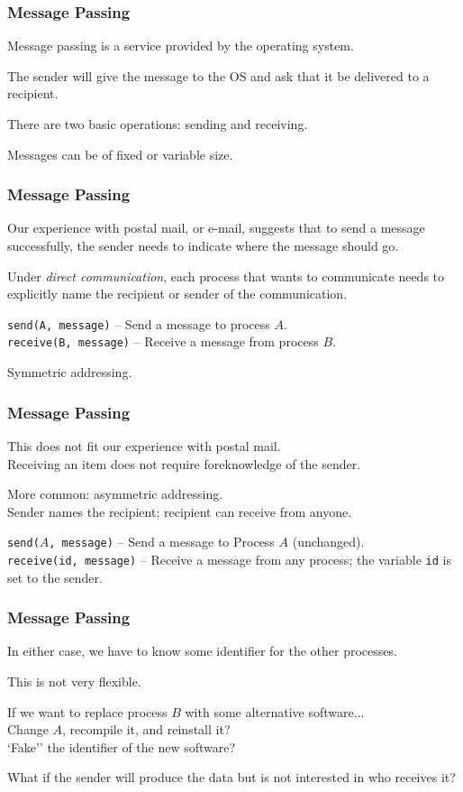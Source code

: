 \begin{frame}
\frametitle{Message Passing}

Message passing is a service provided by the operating system.

The sender will give the message to the OS and ask that it be delivered to a recipient.

  There are two basic operations: sending and receiving. 
  
  Messages can be of fixed or variable size.


\end{frame}

\begin{frame}
\frametitle{Message Passing}

Our experience with postal mail, or e-mail, suggests that to send a message successfully, the sender needs to indicate where the message should go. 

Under \textit{direct communication}, each process that wants to communicate needs to explicitly name the recipient or sender of the communication.


\texttt{send(A, message)} -- Send a message to process $A$.\\
\texttt{receive(B, message)} -- Receive a message from process $B$.

Symmetric addressing.

\end{frame}

\begin{frame}
\frametitle{Message Passing}

This does not fit our experience with postal mail.\\
\quad Receiving an item does not require foreknowledge of the sender.

More common: asymmetric addressing.\\
\quad Sender names the recipient; recipient can receive from anyone.

\texttt{send($A$, message)} -- Send a message to Process $A$ (unchanged).\\
\texttt{receive(id, message)} -- Receive a message from any process; the variable \texttt{id} is set to the sender.

\end{frame}

\begin{frame}
\frametitle{Message Passing}

In either case, we have to know some identifier for the other processes. 

This is not very flexible.

If we want to replace process $B$ with some alternative software...\\
\quad Change $A$, recompile it, and reinstall it?\\
\quad `Fake'' the identifier of the new software? 

What if the sender will produce the data but is not interested in who receives it?

\end{frame}

